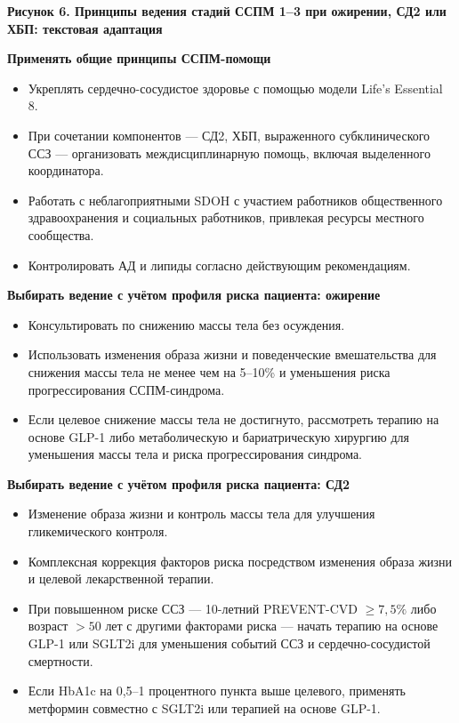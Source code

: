 \documentclass[11pt,a4paper]{article}
\newcommand{\heading}[1]{\par\medskip\textbf{#1}\par}
\begin{document}
\heading{Рисунок 6. Принципы ведения стадий ССПМ 1--3 при ожирении, СД2 или ХБП: текстовая адаптация}
\heading{Применять общие принципы ССПМ-помощи}
\begin{itemize}
\item Укреплять сердечно-сосудистое здоровье с помощью модели Life's Essential 8.
\item При сочетании компонентов --- СД2, ХБП, выраженного субклинического ССЗ --- организовать междисциплинарную помощь, включая выделенного координатора.
\item Работать с неблагоприятными SDOH с участием работников общественного здравоохранения и социальных работников, привлекая ресурсы местного сообщества.
\item Контролировать АД и липиды согласно действующим рекомендациям.
\end{itemize}

\heading{Выбирать ведение с учётом профиля риска пациента: ожирение}
\begin{itemize}
\item Консультировать по снижению массы тела без осуждения.
\item Использовать изменения образа жизни и поведенческие вмешательства для снижения массы тела не менее чем на 5--10\% и уменьшения риска прогрессирования ССПМ-синдрома.
\item Если целевое снижение массы тела не достигнуто, рассмотреть терапию на основе GLP-1 либо метаболическую и бариатрическую хирургию для уменьшения массы тела и риска прогрессирования синдрома.
\end{itemize}

\heading{Выбирать ведение с учётом профиля риска пациента: СД2}
\begin{itemize}
\item Изменение образа жизни и контроль массы тела для улучшения гликемического контроля.
\item Комплексная коррекция факторов риска посредством изменения образа жизни и целевой лекарственной терапии.
\item При повышенном риске ССЗ --- 10-летний PREVENT-CVD $\geq7{,}5\%$ либо возраст $>50$ лет с другими факторами риска --- начать терапию на основе GLP-1 или SGLT2i для уменьшения событий ССЗ и сердечно-сосудистой смертности.
\item Если HbA1c на 0,5--1 процентного пункта выше целевого, применять метформин совместно с SGLT2i или терапией на основе GLP-1.
\end{itemize}
\end{document}
